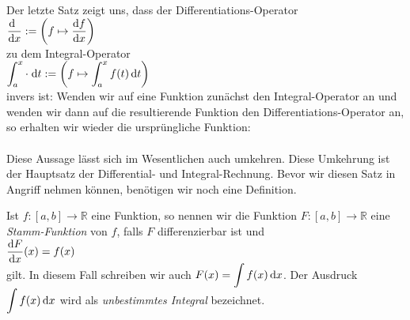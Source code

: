 \remark
Der letzte Satz zeigt uns, dass der Differentiations-Operator
\\[0.2cm]
\hspace*{1.3cm}
$\displaystyle\frac{\textrm{d}\,\;}{\textrm{d}x} := \left(f \mapsto \frac{\textrm{d}f}{\textrm{d}x} \right)$ 
\\[0.2cm]
zu dem Integral-Operator
\\[0.2cm]
\hspace*{1.3cm}
$\displaystyle\int_{a}^x \cdot \;\textrm{d} t := \left(f \mapsto \int_a^x f(t) \, \textrm{d} t\right)$ 
\\[0.2cm]
invers ist: Wenden wir auf eine Funktion zun\"achst den
Integral-Operator an und wenden wir dann auf die resultierende Funktion den
Differentiations-Operator an, so erhalten wir wieder die urspr\"ungliche Funktion:
\\[0.2cm]
\hspace*{1.3cm}
\colorbox{orange}{}
\\[0.2cm]
Diese Aussage
l\"asst sich im Wesentlichen auch umkehren.  Diese Umkehrung ist der Hauptsatz der Differential- und
Integral-Rechnung.  Bevor wir diesen Satz in Angriff nehmen k\"onnen, ben\"otigen wir noch eine Definition.
\pagebreak

\begin{Definition} \lb
Ist $f:[a,b] \rightarrow \mathbb{R}$ eine Funktion, so nennen wir die Funktion  $F:[a,b]\rightarrow\mathbb{R}$ 
eine \emph{Stamm-Funktion} von $f$, falls $F$ differenzierbar ist und 
\\[0.2cm]
\hspace*{1.3cm} $\displaystyle\frac{\textrm{d}F}{\textrm{d}x}(x) = f(x)$
\\[0.2cm]
gilt.  In diesem Fall schreiben wir auch  $\displaystyle F(x) = \int f(x) \, \textrm{d} x$.
Der Ausdruck $\displaystyle\int f(x) \, \textrm{d} x$ wird als \emph{unbestimmtes Integral} bezeichnet. \eod
\end{Definition}


